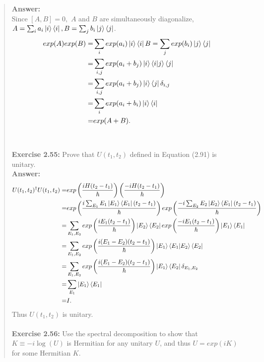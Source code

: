 \documentclass[UTF8]{ctexart}
\begin{document}
\begin{quote}
\textbf{Answer:}\\
Since $[A, B] = 0,$ $A$ and $B$ are simultaneously diagonalize, $A = \sum_{i} a_{i} \ket{i}\bra{i}, B = \sum_{j} b_{i}\ket{j}\bra{j}$.
\begin{equation}
	\begin{aligned}
		exp(A) exp(B)=&\sum_{i}exp(a_{i}) \ket{i}\bra{i} B = \sum_{j} exp(b_{i})\ket{j}\bra{j} \\
					 =&\sum_{i,j}exp(a_{i}+b_{j})\ket{i}\bra{i}\ket{j}\bra{j}\\
					 =&\sum_{i,j}exp(a_{i}+b_{j})\ket{i}\bra{j}\delta_{i,j} \\
					 =&\sum_{i}exp(a_{i}+b_{i})\ket{i}\bra{i}\\
					 =&exp(A+B).\\
	\end{aligned}
	\end{equation}
	\\
	\\
\textbf{Exercise 2.55: } 
Prove that $U(t_{1},t_{2})$ defined in Equation (2.91) is unitary.
\\
\textbf{Answer:}\\
\begin{equation}
	\begin{aligned}
	U(t_{1},t_{2})^{\dagger}U(t_{1},t_{2})=&exp\left(\frac{iH(t_{2}-t_{1})}{ \hbar}\right)
		\left(\frac{-iH(t_{2}-t_{1})}{\hbar}\right) \\
		=&exp\left(\frac{i\sum_{E_{1}}E_{1}\ket{E_{1}}\bra{E_{1}}(t_{2}-t_{1})}{\hbar}\right)
		exp\left(\frac{-i\sum_{E_{2}}E_{2}\ket{E_{2}}\bra{E_{1}}(t_{2}-t_{1})}{\hbar}\right)\\
		=&\sum_{E_{1},E_{2}}exp\left(\frac{iE_{1}(t_{2}-t_{1})}{\hbar}\right)\ket{E_{2}}\bra{E_{2}}
		exp\left( \frac{-iE_{1}(t_{2}-t_{1})}{\hbar}\right)\ket{E_{1}}\bra{E_{1}} \\
		=&\sum_{E_{1},E_{2}}exp\left(\frac{i(E_{1}-E_{2})(t_{2}-t_{1})}{\hbar}\right)\ket{E_{1}}\bra{E_{1}}\ket{E_{2}}\bra{E_{2}} \\
		=&\sum_{E_{1},E_{2}}exp\left(\frac{i(E_{1}-E_{2})(t_{2}-t_{1})}{\hbar}\right)\ket{E_{1}}\bra{E_{2}}\delta_{E_{1},E_{2}} \\
		=&\sum_{E_{1}}\ket{E_{1}}\bra{E_{1}}\\
		=&I.
	\end{aligned}
	\end{equation}
Thus $U(t_{1},t_{2})$ is unitary.
\\
\\
\textbf{Exercise 2.56: } Use the spectral decomposition to show that $K ≡ −i \log(U )$ is Hermitian for any unitary $U$, and thus $U = exp(iK)$ for some Hermitian $K$.

\end{quote}
\end{document}

